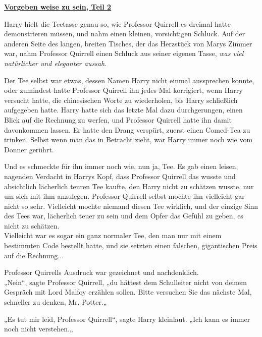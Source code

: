 

\hypertarget{vorgeben-weise-zu-sein-teil-2}{%

\textbf{\uline{Vorgeben weise zu sein, Teil 2}}

\hfill\break Harry hielt die Teetasse genau so, wie Professor Quirrell es dreimal hatte demonstrieren müssen, und nahm einen kleinen, vorsichtigen Schluck. Auf der anderen Seite des langen, breiten Tisches, der das Herzstück von Marys Zimmer war, nahm Professor Quirrell einen Schluck aus seiner eigenen Tasse, \emph{was viel natürlicher und eleganter aussah}.

Der Tee selbst war etwas, dessen Namen Harry nicht einmal aussprechen konnte, oder zumindest hatte Professor Quirrell ihn jedes Mal korrigiert, wenn Harry versucht hatte, die chinesischen Worte zu wiederholen, bis Harry schließlich aufgegeben hatte. Harry hatte sich das letzte Mal dazu durchgerungen, einen Blick auf die Rechnung zu werfen, und Professor Quirrell hatte ihn damit davonkommen lassen. Er hatte den Drang verspürt, zuerst einen Comed-Tea zu trinken. Selbst wenn man das in Betracht zieht, war Harry immer noch wie vom Donner gerührt.

Und es schmeckte für ihn immer noch wie, nun ja, Tee. Es gab einen leisen, nagenden Verdacht in Harrys Kopf, dass Professor Quirrell das wusste und absichtlich lächerlich teuren Tee kaufte, den Harry nicht zu schätzen wusste, nur um sich mit ihm anzulegen. Professor Quirrell selbst mochte ihn vielleicht gar nicht so sehr. Vielleicht mochte niemand diesen Tee wirklich, und der einzige Sinn des Tees war, lächerlich teuer zu sein und dem Opfer das Gefühl zu geben, es nicht zu schätzen.\\ Vielleicht war es sogar ein ganz normaler Tee, den man nur mit einem bestimmten Code bestellt hatte, und sie setzten einen falschen, gigantischen Preis auf die Rechnung...

Professor Quirrells Ausdruck war gezeichnet und nachdenklich.\\ „Nein“, sagte Professor Quirrell, „du hättest dem Schulleiter nicht von deinem Gespräch mit Lord Malfoy erzählen sollen. Bitte versuchen Sie das nächste Mal, schneller zu denken, Mr. Potter.„

„Es tut mir leid, Professor Quirrell“, sagte Harry kleinlaut. „Ich kann es immer noch nicht verstehen.„

}
